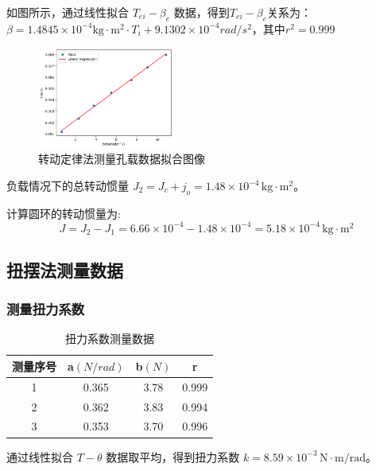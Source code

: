 \documentclass[UTF8]{ctexart}
\begin{document}
如图所示，通过线性拟合 \(T_{ei} - \beta_{e}\) 数据，得到\(T_{ei} - \beta_{e}\)关系为：$\beta = 1.4845 \times 10^{-4}\text{kg} \cdot \text{m}^2\cdot T_i +9.1302 \times 10^{-4} rad/s^2$，其中$r^2=0.999$
\\
\begin{figure}[htbp]
    \centering
    \includegraphics[width=0.4\textwidth]{picture1.png}
    \caption{转动定律法测量孔载数据拟合图像}
\end{figure}

负载情况下的总转动惯量 \(J_2 = J_c+j_o = 1.48 \times 10^{-4} \, \text{kg} \cdot \text{m}^2\)。

计算圆环的转动惯量为:
\begin{equation}
J = J_2 - J_1 = 6.66 \times 10^{-4} - 1.48 \times 10^{-4} = 5.18 \times 10^{-4} \, \text{kg} \cdot \text{m}^2
\end{equation}

\subsection{扭摆法测量数据}
\subsubsection{测量扭力系数}
\begin{table}[h]
    \centering
    \caption{扭力系数测量数据}
    \begin{tabular}{cccc}
        \toprule
        测量序号 & a\((N/rad)\) & b\((N)\) & r  \\
        \midrule
        1 & 0.365 & 3.78 & 0.999\\
        2 & 0.362 & 3.83 & 0.994\\
        3 & 0.353 & 3.70 & 0.996\\
        \bottomrule
    \end{tabular}
\end{table}

通过线性拟合 \(T - \theta\) 数据取平均，得到扭力系数 \(k = 8.59\times 10^{-3} \, \text{N} \cdot \text{m} / \text{rad}\)。
\end{document}
